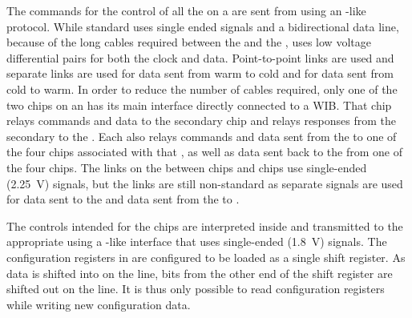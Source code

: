 The commands for the control of all the  on a  are sent 
from  using an -like\cite{i2c} protocol. While standard 
 uses single ended  signals and a bidirectional data 
line, because of the long cables required between the  and the 
,  uses low voltage differential pairs for both 
the  clock and data. Point-to-point links are used and separate 
links are used for data sent from warm to cold and for data sent from cold to 
warm. In order to reduce the number of cables required, only one of the two 
 chips on an  has its main  interface 
directly connected to a WIB. That  chip relays  
commands and data to the secondary  chip and relays  
responses from the secondary  to the . Each 
 also relays  commands and data sent from the 
 to one of the four  chips associated with that 
, as well as data sent back to the  from one of the 
four  chips. The links on the  between  
chips and  chips use single-ended (\SI{2.25}{V})  
signals, but the  links are still non-standard as separate signals 
are used for data sent to the  and data sent from the 
 to .

The controls intended for the   chips are interpreted 
inside  and transmitted to the appropriate  using 
a -like interface that uses single-ended (\SI{1.8}{V})  
signals. The configuration registers in  are configured to be 
loaded as a single shift register. As data is shifted into  on 
the  line, bits from the other end of the shift register are shifted 
out on the  line. It is thus only possible to read  
configuration registers while writing new configuration data.

